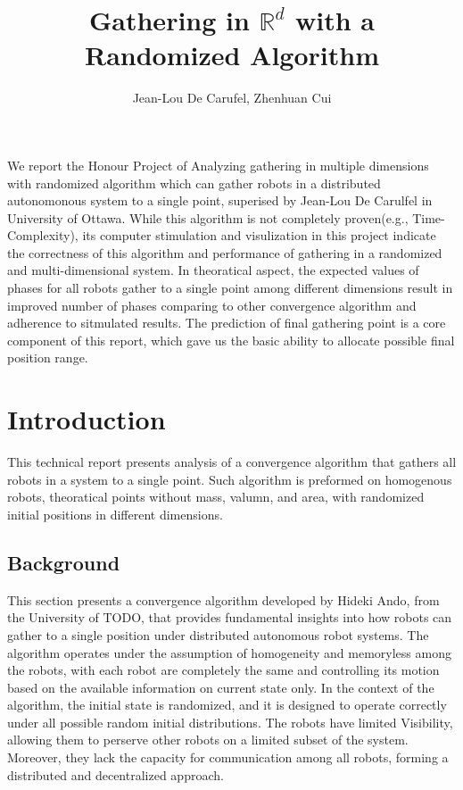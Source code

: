 \documentclass[]{report}
\title{Gathering in $\mathbb{R}^d$ with a Randomized Algorithm}
\author{Jean-Lou De Carufel, Zhenhuan Cui}
\begin{document}
\maketitle

\tableofcontents
\abstract
We report the Honour Project of Analyzing gathering in multiple dimensions with randomized algorithm which can gather robots in a distributed autonomonous system to a single point, superised by Jean-Lou De Carulfel in University of Ottawa. While this algorithm is not completely proven(e.g., Time-Complexity), its computer stimulation and visulization in this project indicate the correctness of this algorithm and performance of gathering in a randomized and multi-dimensional system. In theoratical aspect, the expected values of phases for all robots gather to a single point among different dimensions result in improved number of phases comparing to other convergence algorithm and adherence to sitmulated results. The prediction of final gathering point is a core component of this report, which gave us the basic ability to allocate possible final position range. 
\chapter{Introduction}
This technical report presents analysis of a convergence algorithm that gathers all robots in a system to a single point. Such algorithm is preformed on homogenous robots, theoratical points without mass, valumn, and area, with randomized initial positions in different dimensions. 
\section{Background}
This section presents a convergence algorithm developed by Hideki Ando, from the University of TODO, that provides fundamental insights into how robots can gather to a single position under distributed autonomous robot systems. The algorithm operates under the assumption of homogeneity and memoryless among the robots, with each robot are completely the same and controlling its motion based on the available information on current state only. In the context of the algorithm, the initial state is randomized, and it is designed to operate correctly under all possible random initial distributions. The robots have limited Visibility, allowing them to perserve other robots on a limited subset of the system. Moreover, they lack the capacity for communication among all robots, forming a distributed and decentralized approach.\\
\end{document}
